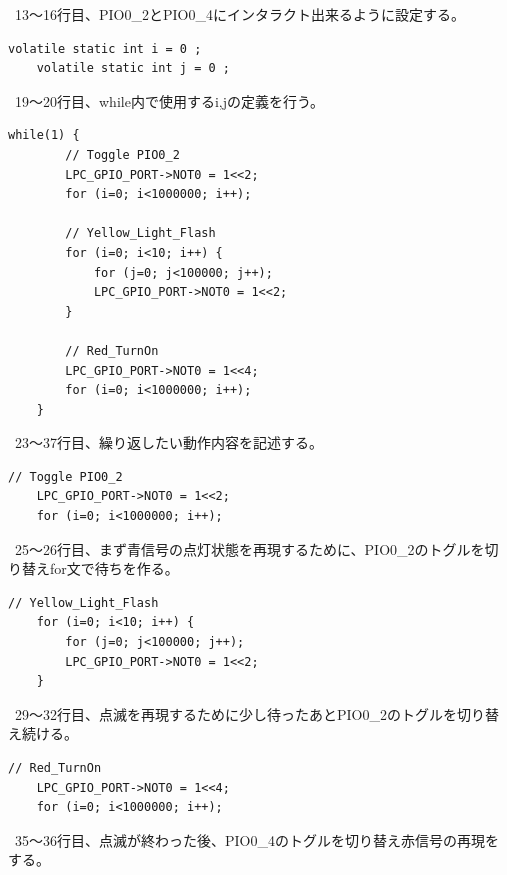 \documentclass[titlepage]{ujarticle}
\begin{document}
	\vspace{\baselineskip}
	\ 13～16行目、PIO0\_2とPIO0\_4にインタラクト出来るように設定する。 \par
	\vspace{\baselineskip}
	\begin{lstlisting}[caption = 19～20行目, label = program1]
	volatile static int i = 0 ;
	volatile static int j = 0 ;
	\end{lstlisting}
	\vspace{\baselineskip}
	\ 19～20行目、while内で使用するi,jの定義を行う。 \par
	\vspace{\baselineskip}
	\begin{lstlisting}[caption = 23～37行目, label = program1]
	while(1) {
		// Toggle PIO0_2
		LPC_GPIO_PORT->NOT0 = 1<<2;	
		for (i=0; i<1000000; i++);
		
		// Yellow_Light_Flash
		for (i=0; i<10; i++) {
			for (j=0; j<100000; j++);
			LPC_GPIO_PORT->NOT0 = 1<<2;
		}
		
		// Red_TurnOn
		LPC_GPIO_PORT->NOT0 = 1<<4;
		for (i=0; i<1000000; i++);
	}
	\end{lstlisting}
	\vspace{\baselineskip}
	\ 23～37行目、繰り返したい動作内容を記述する。 \par
	\vspace{\baselineskip}
	\begin{lstlisting}[caption = 25～26行目, label = program1]
	// Toggle PIO0_2
	LPC_GPIO_PORT->NOT0 = 1<<2;	
	for (i=0; i<1000000; i++);
	\end{lstlisting}
	\vspace{\baselineskip}
	\ 25～26行目、まず青信号の点灯状態を再現するために、PIO0\_2のトグルを切り替えfor文で待ちを作る。 \par
\newpage
	\vspace{\baselineskip}
	\begin{lstlisting}[caption = 29～32行目, label = program1]
	// Yellow_Light_Flash
	for (i=0; i<10; i++) {
		for (j=0; j<100000; j++);
		LPC_GPIO_PORT->NOT0 = 1<<2;
	}
	\end{lstlisting}
	\vspace{\baselineskip}
	\ 29～32行目、点滅を再現するために少し待ったあとPIO0\_2のトグルを切り替え続ける。 \par
	\vspace{\baselineskip}
	\begin{lstlisting}[caption = 35～36行目, label = program1]
	// Red_TurnOn
	LPC_GPIO_PORT->NOT0 = 1<<4;
	for (i=0; i<1000000; i++);
	\end{lstlisting}
	\vspace{\baselineskip}
	\ 35～36行目、点滅が終わった後、PIO0\_4のトグルを切り替え赤信号の再現をする。 \par
	\vspace{\baselineskip}
\end{document}
